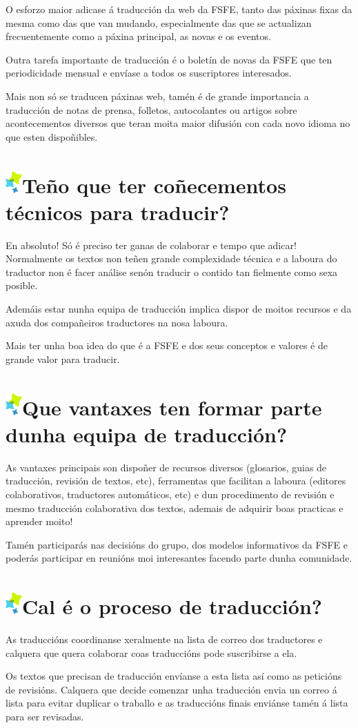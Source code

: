 \documentclass[10pt,foldmark,tumble]{leaflet}
\newcommand{\tit}[1]{\section{\includegraphics{item.png}#1}}
\begin{document}
O esforzo maior adicase á traducción da web da FSFE, tanto das páxinas fixas da mesma como das que van mudando, especialmente das que se actualizan frecuentemente como a páxina principal, as novas e os eventos. 

Outra tarefa importante de traducción é o boletín de novas da FSFE que ten periodicidade mensual e envíase a todos os suscriptores interesados.

Mais non só se traducen páxinas web, tamén é de grande importancia a traducción de notas de prensa, folletos, autocolantes ou artigos sobre acontecementos diversos que teran moita maior difusión con cada novo idioma no que esten dispoñibles.

\tit{Teño que ter coñecementos técnicos para traducir?}

En absoluto! Só é preciso ter ganas de colaborar e tempo que adicar! Normalmente os textos non teñen grande complexidade técnica e a laboura do traductor non é facer análise senón traducir o contido tan fielmente como sexa posible. 

Ademáis estar nunha equipa de traducción implica dispor de moitos recursos e da axuda dos compañeiros traductores na nosa laboura.

Mais ter unha boa idea do que é a FSFE e dos seus conceptos e valores é de grande valor para traducir.

\tit{Que vantaxes ten formar parte dunha equipa de traducción?}

As vantaxes principais son dispoñer de recursos diversos (glosarios, guias de traducción, revisión de textos, etc), ferramentas que facilitan a laboura (editores colaborativos, traductores automáticos, etc) e dun procedimento de revisión e mesmo traducción colaborativa dos textos, ademais de adquirir boas practicas e aprender moito!

Tamén participarás nas decisións do grupo, dos modelos informativos da FSFE e poderás participar en reunións moi interesantes facendo parte dunha comunidade.

\tit{Cal é o proceso de traducción?}

As traduccións coordinanse xeralmente na lista de correo dos traductores e calquera que quera colaborar coas traduccións pode suscribirse a ela. 

Os textos que precisan de traducción envíanse a esta lista así como as peticións de revisións. Calquera que decide comenzar unha traducción envia un correo á lista para evitar duplicar o traballo e as traduccións finais enviánse tamén á lista para ser revisadas.
\end{document}
